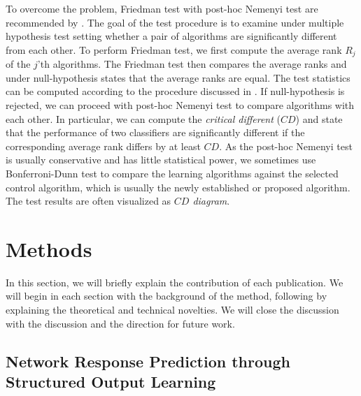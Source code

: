 {%
To overcome the problem, Friedman test \citep{Friedman37the,Friedman40Comparison} with post-hoc Nemenyi test \citep{Nemenyi63distribution} are recommended by \citet{Demsar06statistical}.
The goal of the test procedure is to examine under multiple hypothesis test setting whether a pair of algorithms are significantly different from each other.
To perform Friedman test, we first compute the average rank $R_j$ of the $j$'th algorithms.
The Friedman test then compares the average ranks and under null-hypothesis states that the average ranks are equal.
The test statistics can be computed according to the procedure discussed in \citep{Demsar06statistical}.
If null-hypothesis is rejected, we can proceed with post-hoc Nemenyi test to compare algorithms with each other.
In particular, we can compute the \textit{critical different} ($CD$) and state that the performance of two classifiers are significantly different if the corresponding average rank differs by at least $CD$.
As the post-hoc Nemenyi test is usually conservative and has little statistical power, we sometimes use Bonferroni-Dunn test \citep{Dunn61mulitple} to compare the learning algorithms against the selected control algorithm, which is usually the newly established or proposed algorithm.
The test results are often visualized as \textit{$CD$ diagram}.













\chapter{Methods}

In this section, we will briefly explain the contribution of each publication.
We will begin in each section with the background of the method, following by explaining the theoretical and technical novelties.
We will close the discussion with the discussion and the direction for future work.



\section{Network Response Prediction through Structured Output Learning}

}
